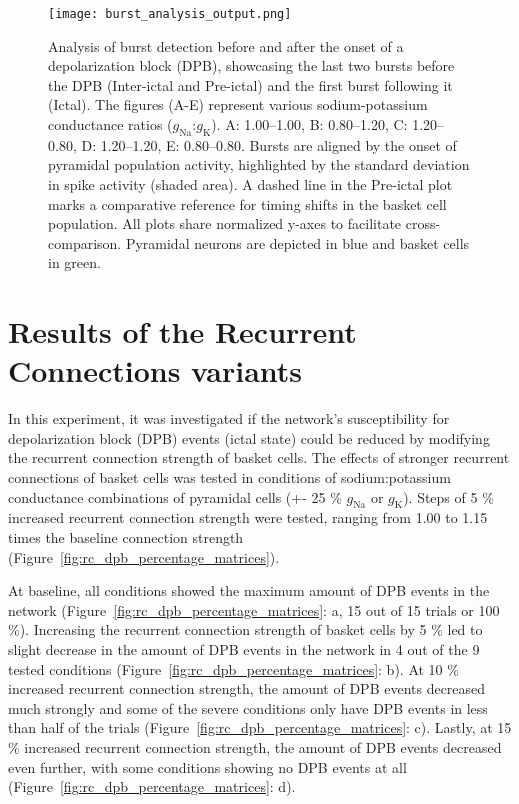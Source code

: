 \begin{figure}[htbp]
    \centering
    \texttt{[image: burst\_analysis\_output.png]}
    \caption[Burst detection near the onset of a depolarization block]{Analysis of burst detection
        before and after the onset of a depolarization block (DPB), showcasing the last two bursts before
        the DPB (Inter-ictal and Pre-ictal) and the first burst following it (Ictal). The figures (A-E)
        represent various sodium-potassium conductance ratios (\(g_{\text{Na}}\):\(g_{\text{K}}\)).
        A\@: 1.00--1.00, B\@: 0.80--1.20, C\@: 1.20--0.80, D\@: 1.20--1.20, E\@: 0.80--0.80.
        Bursts are aligned by the onset of pyramidal population activity, highlighted by the standard
        deviation in spike activity (shaded area). A dashed line in the Pre-ictal plot marks a
        comparative reference for timing shifts in the basket cell population.
        All plots share normalized y-axes to facilitate cross-comparison.
        Pyramidal neurons are depicted in blue and basket cells in green.}\label{fig:burst_detection}
\end{figure}
\pagebreak

\section{Results of the Recurrent Connections variants}
In this experiment, it was investigated if the network's susceptibility for depolarization block (DPB) events (ictal state) could be reduced by modifying the recurrent connection strength of basket cells.
The effects of stronger recurrent connections of basket cells was tested in conditions of sodium:potassium conductance combinations of pyramidal cells (+- 25 \% \(g_{\text{Na}}\) or \(g_{\text{K}}\)).
Steps of 5 \% increased recurrent connection strength were tested, ranging from 1.00 to 1.15 times the baseline connection strength (Figure~\ref{fig:rc_dpb_percentage_matrices}).

At baseline, all conditions showed the maximum amount of DPB events in the network (Figure~\ref{fig:rc_dpb_percentage_matrices}: a, 15 out of 15 trials or 100 \%).
Increasing the recurrent connection strength of basket cells by 5 \% led to slight decrease in the amount of DPB events in the network in 4 out of the 9 tested conditions (Figure~\ref{fig:rc_dpb_percentage_matrices}: b).
At 10 \% increased recurrent connection strength, the amount of DPB events decreased much strongly and some of the severe conditions only have DPB events in less than half of the trials (Figure~\ref{fig:rc_dpb_percentage_matrices}: c).
Lastly, at 15 \% increased recurrent connection strength, the amount of DPB events decreased even further, with some conditions showing no DPB events at all (Figure~\ref{fig:rc_dpb_percentage_matrices}: d).\\

